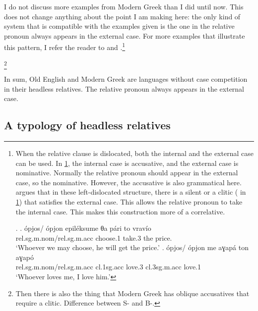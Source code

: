 I do not discuss more examples from Modern Greek than I did until now. This does not change anything about the point I am making here: the only kind of system that is compatible with the examples given is the one in the relative pronoun always appears in the external case. For more examples that illustrate this pattern, I refer the reader to  and .\footnote{
When the relative clause is dislocated, both the internal and the external case can be used. In \ref{ex:greek-dislocated-acc-nom}, the internal case is accusative, and the external case is nominative. Normally the relative pronoun should appear in the external case, so the nominative. However, the accusative is also grammatical here. \citet{spyropoulos2011} argues that in these left-dislocated structure, there is a silent  or a clitic ( in \ref{ex:greek-dislocated-nom-acc}) that satisfies the external case. This allows the relative pronoun to take the internal case. This makes this construction more of a correlative.

\ex.
\ag. ópjos/ ópjon epiléksume θa pári to vravío\\
\ac{rel}.\ac{sg}.\ac{m}.\ac{nom}/\ac{rel}.\ac{sg}.\ac{m}.\ac{acc} choose.1\scsub{[acc]}  take.3\scsub{[nom]} the price.\\
`Whoever we may choose, he will get the price.'\label{ex:greek-dislocated-acc-nom}
\bg. ópjos/ ópjon me aɣapá ton aɣapó\\
\ac{rel}.\ac{sg}.\ac{m}.\ac{nom}/\ac{rel}.\ac{sg}.\ac{m}.\ac{acc} \ac{cl}.1\ac{sg}.\ac{acc} love.3\scsub{[nom]}
\ac{cl}.3\ac{sg}.\ac{m}.\ac{acc} love.1\scsub{[acc]}\\
`Whoever loves me, I love him.'\label{ex:greek-dislocated-nom-acc}

\phantom{x}
}

\footnote{Then there is also the thing that Modern Greek has oblique accusatives that require a clitic. Difference between S- and B-.}

In sum, Old English and Modern Greek are languages without case competition in their headless relatives. The relative pronoun always appears in the external case.

\subsection{A typology of headless relatives}\label{sec:typology}

